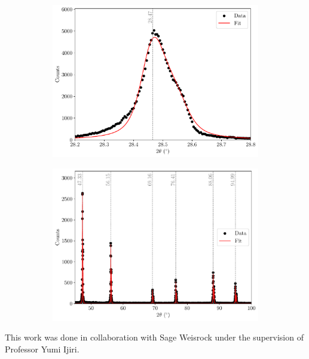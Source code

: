 \documentclass{../paper}
\begin{document}
\begin{figure}
  \centering
  \begin{subfigure}{\columnwidth}
    \centering
    \includegraphics[width=\textwidth]{analysis/peaks-Si_polycrystalline-1st_peak.pdf}
    \caption{}
    \label{fig:peaks-polycrystalline-a}
  \end{subfigure}
  \begin{subfigure}{\columnwidth}
    \centering
    \includegraphics[width=\textwidth]{analysis/peaks-Si_polycrystalline.pdf}
    \caption{}
    \label{fig:peaks-polycrystalline-b}
  \end{subfigure}

  \caption{}
  \label{fig:peaks-polycrystalline}
\end{figure}

\begin{acknowledgements}
  This work was done in collaboration with Sage Weisrock under the supervision of Professor Yumi Ijiri.
\end{acknowledgements}


\end{document}
